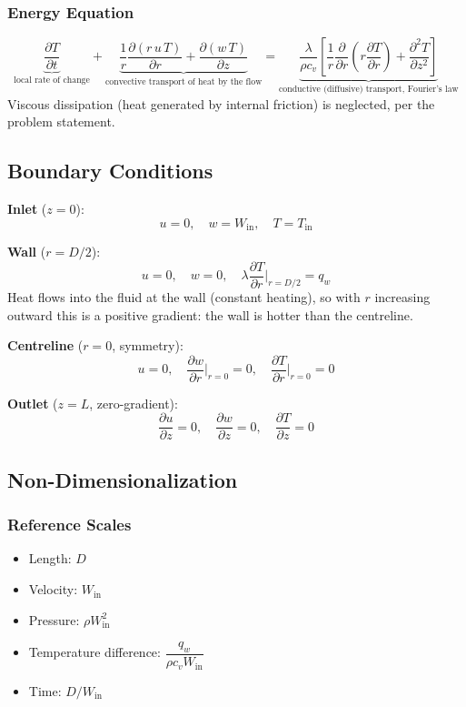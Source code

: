 \documentclass[12pt,a4paper]{article}
\newcommand{\parder}[2]{\frac{\partial #1}{\partial #2}}
\newcommand{\pparder}[2]{\frac{\partial^2 #1}{\partial {#2}^2}}
\begin{document}
\subsubsection{Energy Equation}

\begin{equation}
    \underbrace{\parder{T}{t}}_{\text{local rate of change}}
    + \underbrace{\frac{1}{r}\parder{(r\,u\,T)}{r} + \parder{(w\,T)}{z}}_{\text{convective transport of heat by the flow}}
    = \underbrace{\frac{\lambda}{\rho c_v}\left[\frac{1}{r}\parder{}{r}\!\left(r\parder{T}{r}\right) + \pparder{T}{z}\right]}_{\text{conductive (diffusive) transport, Fourier's law}}
    \label{eq:energy_dim}
\end{equation}
Viscous dissipation (heat generated by internal friction) is neglected, per the problem statement.

\subsection{Boundary Conditions}

\textbf{Inlet} ($z = 0$):
\begin{equation}
    u = 0, \quad w = W_{\text{in}}, \quad T = T_{\text{in}}
\end{equation}

\textbf{Wall} ($r = D/2$):
\begin{equation}
    u = 0, \quad w = 0, \quad \lambda\parder{T}{r}\bigg|_{r=D/2} = q_w
\end{equation}
Heat flows into the fluid at the wall (constant heating), so with $r$ increasing outward this is a positive gradient: the wall is hotter than the centreline.

\textbf{Centreline} ($r = 0$, symmetry):
\begin{equation}
    u = 0, \quad \parder{w}{r}\bigg|_{r=0} = 0, \quad \parder{T}{r}\bigg|_{r=0} = 0
\end{equation}

\textbf{Outlet} ($z = L$, zero-gradient):
\begin{equation}
    \parder{u}{z} = 0, \quad \parder{w}{z} = 0, \quad \parder{T}{z} = 0
\end{equation}

\newpage

\subsection{Non-Dimensionalization}

\subsubsection{Reference Scales}
\begin{itemize}
    \item Length: $D$
    \item Velocity: $W_{\text{in}}$
    \item Pressure: $\rho W_{\text{in}}^2$
    \item Temperature difference: $\dfrac{q_w}{\rho c_v W_{\text{in}}}$
    \item Time: $D / W_{\text{in}}$
\end{itemize}
\end{document}
